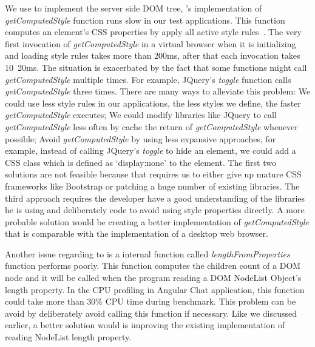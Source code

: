 We use \jsdom{} to implement the server side DOM tree,
\jsdom{}'s implementation of \emph{getComputedStyle} function runs slow in our test applications.
This function computes an element's CSS properties by apply all active style rules~\cite{wilson2000document}.
The very first invocation of \emph{getComputedStyle} in a virtual browser when it
is initializing and loading style rules takes more than 200ms, 
after that each invocation takes 10~20ms.
The situation is exacerbated by the fact that some functions might call \emph{getComputedStyle}
multiple times.
For example, JQuery's \emph{toggle} function calls \emph{getComputedStyle} three times.
There are many ways to alleviate this problem:
We could use less style rules in our applications, the less styles we define,
the faster \emph{getComputedStyle} executes;
We could modify libraries like JQuery to call \emph{getComputedStyle} less often
by cache the return of \emph{getComputedStyle} whenever possible;
Avoid \emph{getComputedStyle} by using less expansive approaches, for example,
instead of calling JQuery's \emph{toggle} to hide an element, 
we could add a CSS class which is defined as `display:none' to the element.
The first two solutions are not feasible because that requires us to either give up
mature CSS frameworks like Bootstrap or patching a huge number of existing \js{} libraries.
The third approach requires the developer have a good understanding of the libraries
he is using and deliberately code to avoid using style properties directly.
A more probable solution would be creating a better implementation of \emph{getComputedStyle} 
that is comparable with the implementation of a desktop web browser.

Another issue regarding to \jsdom{} is a internal function called \emph{lengthFromProperties} function 
performs poorly.
This function computes the children count of a DOM node and it will be called 
when the program reading a DOM NodeList Object's length property.
In the CPU profiling in Angular Chat application, 
this function could take more than 30\% CPU time during benchmark.%
This problem can be avoid by deliberately avoid calling this function if necessary.
Like we discussed earlier, a better solution would is improving the existing implementation
of reading NodeList length property.

